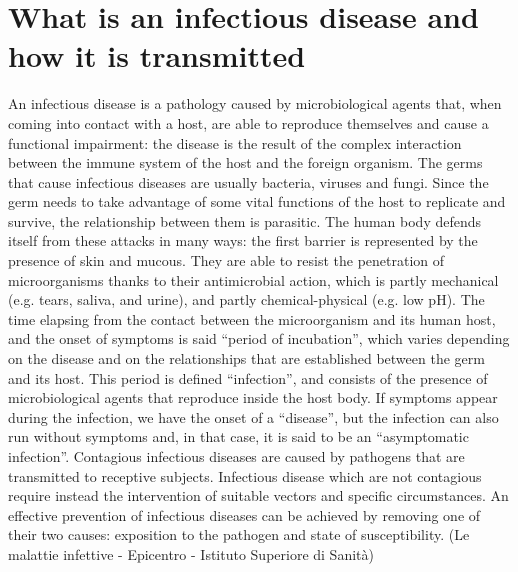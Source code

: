 \documentclass[11pt]{report}
\begin{document}
\section{What is an infectious disease and how it is transmitted}

An infectious disease is a pathology caused by microbiological agents that, when coming into contact with a host, are able to reproduce themselves and cause a functional impairment: the disease is the result of the complex interaction between the immune system of the host and the foreign organism. The germs that cause infectious diseases are usually bacteria, viruses and fungi. Since the germ needs to take advantage of some vital functions of the host to replicate and survive, the relationship between them is parasitic.
The human body defends itself from these attacks in many ways: the first barrier is represented by the presence of skin and mucous. They are able to resist the penetration of microorganisms thanks to their antimicrobial action, which is partly mechanical (e.g. tears, saliva, and urine), and partly chemical-physical (e.g. low pH). The time elapsing from the contact between the microorganism and its human host, and the onset of symptoms is said “period of incubation”, which varies depending on the disease and on the relationships that are established between the germ and its host. This period is defined “infection”, and consists of the presence of microbiological agents that reproduce inside the host body.
If symptoms appear during the infection, we have the onset of a “disease”, but the infection can also run without symptoms and, in that case, it is said to be an “asymptomatic infection”.
Contagious infectious diseases are caused by pathogens that are transmitted to receptive subjects. Infectious disease which are not contagious require instead the intervention of suitable vectors and specific circumstances. An effective prevention of infectious diseases can be achieved by removing one of their two causes: exposition to the pathogen and state of susceptibility.
(Le malattie infettive - Epicentro - Istituto Superiore di Sanità)
\end{document}
